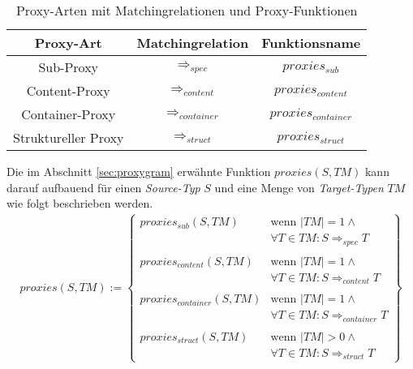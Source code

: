 \begin{table}[H]
\centering
\begin{tabular}{|c|c|c|}
\hline
\hline
\centering\textbf{Proxy-Art} & \textbf{Matchingrelation} & \textbf{Funktionsname}\\
\hline
\hline
Sub-Proxy
&  
$\Rightarrow_{spec}$
& 
$\mathit{proxies_{sub}}$
\\
\hline
Content-Proxy
& 
$\Rightarrow_{content}$
& 
$\mathit{proxies_{content}}$
\\
\hline
Container-Proxy
& 
$\Rightarrow_{container}$
& 
$\mathit{proxies_{container}}$
\\
\hline
Struktureller Proxy
&
$\Rightarrow_{struct}$
& 
$\mathit{proxies_{struct}}$
 \\
\hline
\hline
\end{tabular}
\caption{Proxy-Arten mit Matchingrelationen und Proxy-Funktionen}
 \label{tab:baseMatcher}
\end{table}
\noindent
Die im Abschnitt \ref{sec:proxygram} erwähnte Funktion $\mathit{proxies(S,\mathit{TM})}$ kann darauf aufbauend für einen \emph{Source-Typ} $S$ und eine Menge von \emph{Target-Typen} $\mathit{TM}$ wie folgt beschrieben werden.
\begin{gather*}
\mathit{proxies(S,\mathit{TM})} := 
\left\{\begin{array}{ll}
\mathit{proxies_{sub}(S,\mathit{TM})}	& \text{wenn } |\mathit{TM}| = 1 \wedge \mathit{ }\\
& \forall T \in \mathit{TM}: S \Rightarrow_{spec} T\\	
&\\
\mathit{proxies_{content}(S,\mathit{TM})}	& \text{wenn } |\mathit{TM}| = 1 \wedge \mathit{ }\\
& \forall T \in \mathit{TM}: S \Rightarrow_{content} T \\
&\\
\mathit{proxies_{container}(S,\mathit{TM})} & \text{wenn } |\mathit{TM}| = 1 \wedge \mathit{ } \\
& \forall T \in \mathit{TM}: S \Rightarrow_{container} T \\
&\\
\mathit{proxies_{struct}(S,\mathit{TM})} & \text{wenn } |\mathit{TM}| > 0 \wedge \mathit{ } \\
&\forall T \in \mathit{TM}: S \Rightarrow_{struct} T
		 \end{array}
\right\}
\end{gather*}
